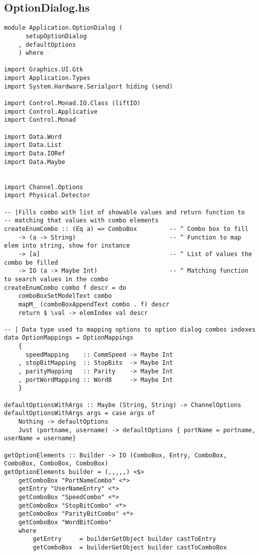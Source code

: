 \documentclass[russian,utf8,simple,emptystyle]{eskdtext}
\begin{document}
\subsection{OptionDialog.hs}
\begin{lstlisting}
module Application.OptionDialog (
      setupOptionDialog
    , defaultOptions
    ) where

import Graphics.UI.Gtk
import Application.Types
import System.Hardware.Serialport hiding (send)

import Control.Monad.IO.Class (liftIO)
import Control.Applicative 
import Control.Monad

import Data.Word 
import Data.List
import Data.IORef
import Data.Maybe 


import Channel.Options
import Physical.Detector 

-- |Fills combo with list of showable values and return function to
-- matching that values with combo elements 
createEnumCombo :: (Eq a) => ComboBox         -- ^ Combo box to fill
    -> (a -> String)                          -- ^ Function to map elem into string, show for instance
    -> [a]                                    -- ^ List of values the combo be filled
    -> IO (a -> Maybe Int)                    -- ^ Matching function to search values in the combo
createEnumCombo combo f descr = do
    comboBoxSetModelText combo
    mapM_ (comboBoxAppendText combo . f) descr
    return $ \val -> elemIndex val descr

-- | Data type used to mapping options to option dialog combos indexes
data OptionMappings = OptionMappings
    {
      speedMapping    :: CommSpeed -> Maybe Int 
    , stopBitMapping  :: StopBits  -> Maybe Int 
    , parityMapping   :: Parity    -> Maybe Int
    , portWordMapping :: Word8     -> Maybe Int
    }

defaultOptionsWithArgs :: Maybe (String, String) -> ChannelOptions
defaultOptionsWithArgs args = case args of 
    Nothing -> defaultOptions 
    Just (portname, username) -> defaultOptions { portName = portname, userName = username}

getOptionElements :: Builder -> IO (ComboBox, Entry, ComboBox, ComboBox, ComboBox, ComboBox)
getOptionElements builder = (,,,,,) <$> 
    getComboBox "PortNameCombo" <*>
    getEntry "UserNameEntry" <*> 
    getComboBox "SpeedCombo" <*>
    getComboBox "StopBitCombo" <*>
    getComboBox "ParityBitCombo" <*>
    getComboBox "WordBitCombo"
    where
        getEntry     = builderGetObject builder castToEntry
        getComboBox  = builderGetObject builder castToComboBox
                

\end{lstlisting}
\end{document}
